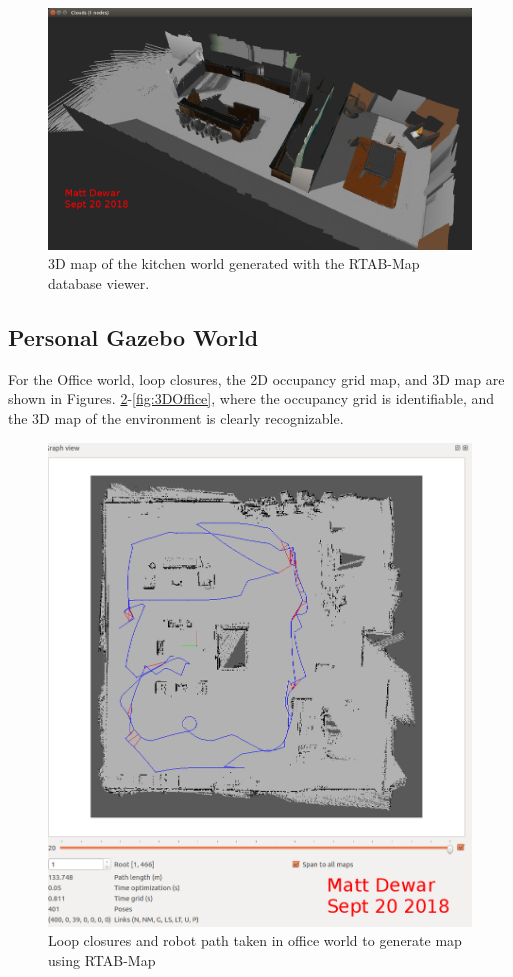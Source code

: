 \documentclass[10pt,journal,compsoc]{IEEEtran}
\begin{document}
\begin{figure}[thpb]
      \centering
      \includegraphics[width=\linewidth]{../img/3d_map_kitchen.png}
      \caption{3D map of the kitchen world generated with the RTAB-Map database viewer.}
      \label{fig:3DKitchen}
\end{figure}

\subsection{Personal Gazebo World}
\label{subsec:officeworld}

For the Office world, loop closures, the 2D occupancy grid map, and 3D map are shown in Figures. \ref{fig:loopclosureOffice}-\ref{fig:3DOffice}, where the occupancy grid is identifiable, and the 3D map of the environment is clearly recognizable.

\begin{figure}[thpb]
      \centering
      \includegraphics[width=\linewidth]{../img/loop_closure_office2.png}
      \caption{Loop closures and robot path taken in office world to generate map using RTAB-Map}
      \label{fig:loopclosureOffice}
\end{figure}
\end{document}
